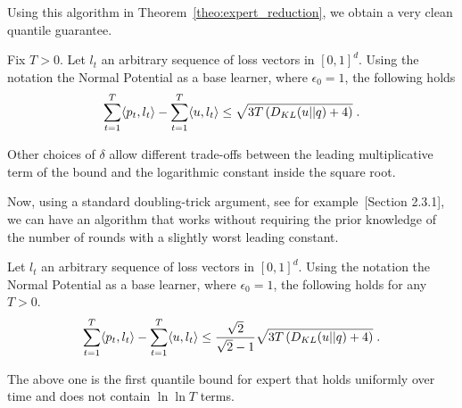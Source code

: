 Using this algorithm in Theorem~\ref{theo:expert_reduction}, we obtain a very clean quantile guarantee.
\begin{cor}
\label{cor:kt_expert}
Fix $T>0$. Let $l_t$ an arbitrary sequence of loss vectors in $[0,1]^d$. Using the notation the Normal Potential as a base learner, where $\epsilon_0=1$, the following holds
\[
\sum_{t=1}^T \langle p_t, l_t\rangle -\sum_{t=1}^T \langle u , l_t\rangle 
\leq \sqrt{3 T \left(D_{KL}(u||q) + 4 \right)} \; .
\]
\end{cor}
Other choices of $\delta$ allow different trade-offs between the leading multiplicative term of the bound and the logarithmic constant inside the square root.

Now, using a standard doubling-trick argument, see for example~\citet{Shalev-Shwartz12}[Section 2.3.1], we can have an algorithm that works without requiring the prior knowledge of the number of rounds with a slightly worst leading constant.
\begin{cor}
\label{cor:kt_expert_no_t}
Let $l_t$ an arbitrary sequence of loss vectors in $[0,1]^d$. Using the notation the Normal Potential as a base learner, where $\epsilon_0=1$, the following holds for any $T>0$.
\[
\sum_{t=1}^T \langle p_t, l_t\rangle -\sum_{t=1}^T \langle u , l_t\rangle 
\leq \frac{\sqrt{2}}{\sqrt{2}-1}\sqrt{3 T \left(D_{KL}(u||q) + 4 \right)} \; .
\]
\end{cor}
The above one is the first quantile bound for expert that holds uniformly over time and does not contain $\ln \ln T$ terms.